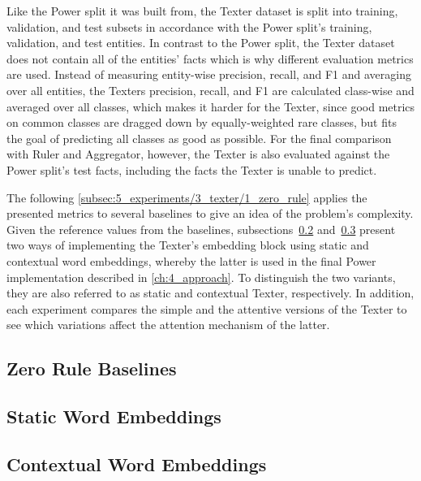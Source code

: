 Like the Power split it was built from, the Texter dataset is split into training, validation, and test subsets in accordance with the Power split's training, validation, and test entities. In contrast to the Power split, the Texter dataset does not contain all of the entities' facts which is why different evaluation metrics are used. Instead of measuring entity-wise precision, recall, and F1 and averaging over all entities, the Texters precision, recall, and F1 are calculated class-wise and averaged over all classes, which makes it harder for the Texter, since good metrics on common classes are dragged down by equally-weighted rare classes, but fits the goal of predicting all classes as good as possible. For the final comparison with Ruler and Aggregator, however, the Texter is also evaluated against the Power split's test facts, including the facts the Texter is unable to predict.

The following \autoref{subsec:5_experiments/3_texter/1_zero_rule} applies the presented metrics to several baselines to give an idea of the problem's complexity. Given the reference values from the baselines, subsections~\ref{subsec:5_experiments/3_texter/2_static} and~\ref{subsec:5_experiments/3_texter/3_context} present two ways of implementing the Texter's embedding block using static and contextual word embeddings, whereby the latter is used in the final Power implementation described in \autoref{ch:4_approach}. To distinguish the two variants, they are also referred to as static and contextual Texter, respectively. In addition, each experiment compares the simple and the attentive versions of the Texter to see which variations affect the attention mechanism of the latter.

\subsection{Zero Rule Baselines}
\label{subsec:5_experiments/3_texter/1_zero_rule}


\subsection{Static Word Embeddings}
\label{subsec:5_experiments/3_texter/2_static}


\subsection{Contextual Word Embeddings}
\label{subsec:5_experiments/3_texter/3_context}

